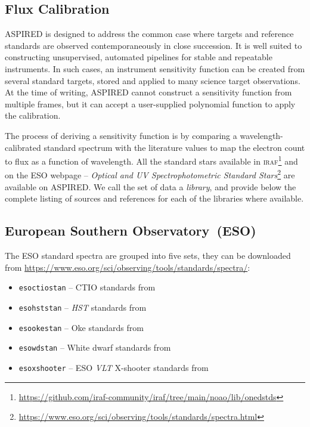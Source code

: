 \documentclass[linenumbers, twocolumn]{aastex631}
\begin{document}
\subsection{Flux Calibration}
\textsc{ASPIRED} is designed to address the common case where targets and
reference standards are observed contemporaneously in close succession. It is
well suited to constructing unsupervised, automated pipelines for stable and
repeatable instruments. In such cases, an instrument sensitivity function can be
created from several standard targets, stored and applied to many science target
observations. At the time of writing, \textsc{ASPIRED} cannot construct a
sensitivity function from multiple frames, but it can accept a user-supplied
polynomial function to apply the calibration.
 
The process of deriving a sensitivity function is by comparing a
wavelength-calibrated standard spectrum with the literature values to map the electron count to flux as a function of wavelength. All
the standard stars available in
\textsc{iraf}\footnote{\url{https://github.com/iraf-community/iraf/tree/main/noao/lib/onedstds}}
and on the ESO webpage -- \textit{Optical and UV Spectrophotometric Standard 
Stars}\footnote{\url{https://www.eso.org/sci/observing/tools/standards/spectra.html}}
are available on \textsc{ASPIRED}. We call the set of data a
\textit{library}, and provide below the complete listing of sources and references
for each of the libraries where available.

\subsection*{European Southern Observatory~(ESO)}
The ESO standard spectra are grouped into five sets, they can be downloaded from \url{https://www.eso.org/sci/observing/tools/standards/spectra/}:

\begin{itemize}
    \item \texttt{esoctiostan} -- CTIO standards from \citet{1992PASP..104..533H, 1994PASP..106..566H}
    \item \texttt{esohststan} -- \textit{HST} standards from \citet{1995AJ....110.1316B, 1996AJ....111.1743B}
    \item \texttt{esookestan} -- Oke standards from \citet{1990AJ.....99.1621O}
    \item \texttt{esowdstan} -- White dwarf standards from \citet{1995AJ....110.1316B}
    \item \texttt{esoxshooter} -- ESO \textit{VLT} X-shooter standards from \citet{2014Msngr.158...16M, 2014A&A...568A...9M}
\end{itemize}
\end{document}

